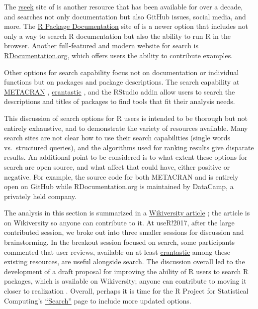 The \href{https://rseek.org}{rseek} site of \citet{goodman} is another
resource that has been available for over a decade, and searches not
only documentation but also GitHub issues, social media, and more. The
\href{https://rdrr.io}{R Package Documentation} site of \citet{rdrrio}
is a newer option that includes not only a way to search R documentation
but also the ability to run R in the browser. Another full-featured and
modern website for search is
\href{https://www.rdocumentation.org/}{RDocumentation.org}, which offers
users the ability to contribute examples.

Other options for search capability focus not on documentation or
individual functions but on packages and package descriptions. The
search capability at \href{https://www.r-pkg.org/}{METACRAN}
\citep{metacran}, \href{http://www.crantastic.org/}{crantastic}
\citep{crantastic}, and the RStudio addin  allow
users to search the descriptions and titles of packages to find tools
that fit their analysis needs.

This discussion of search options for R users is intended to be thorough
but not entirely exhaustive, and to demonstrate the variety of resources
available. Many search sites are not clear how to use their search
capabilities (single words vs.~structured queries), and the algorithms
used for ranking results give disparate results. An additional point to
be considered is to what extent these options for search are open
source, and what affect that could have, either positive or negative.
For example, the source code for both METACRAN and
 is entirely open on GitHub while
RDocumentation.org is maintained by DataCamp, a privately held company.

The analysis in this section is summarized in a
\href{https://en.wikiversity.org/wiki/Searching_R_Packages}{Wikiversity
article} \citep{wikiversity}; the article is on Wikiversity so anyone
can contribute to it. At useR!2017, after the large contributed session,
we broke out into three smaller sessions for discussion and
brainstorming. In the breakout session focused on search, some
participants commented that user reviews, available on at least
\href{http://www.crantastic.org/}{crantastic} among these existing
resources, are useful alongside search. The discussion overall led to
the development of a draft proposal for improving the ability of R users
to search R packages, which is available on Wikiversity; anyone can
contribute to moving it closer to realization \citep{draftProposal}.
Overall, perhaps it is time for the R Project for Statistical
Computing's \href{https://www.r-project.org/search.html}{``Search''}
\citep{search} page to include more updated options.

